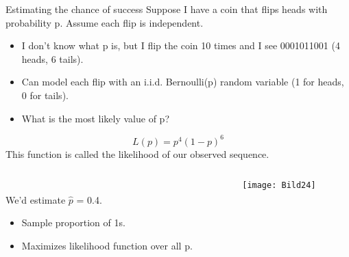 \documentclass[aspectratio=169]{../latex_main/tntbeamer}  %
\begin{document}
	
	\begin{frame}{Estimating the chance of success}
	    Suppose I have a coin that flips heads with probability p. Assume each flip is independent.
	    \begin{itemize}
	        \item I don’t know what p is, but I flip the coin 10 times and I see 0001011001 (4 heads, 6 tails).
	        \item Can model each flip with an i.i.d. Bernoulli(p) random variable (1 for heads, 0 for tails).
	        \item What is the most likely value of p?
	    \end{itemize}
	    \begin{equation*}
	        L(p) = p^4(1-p)^6
	    \end{equation*}
	    This function is called the likelihood of our observed sequence.
	    \begin{columns}
	        \begin{column}{.5\textwidth}
	        \\
	        \bigskip
	                We’d estimate  $\hat{p}$   = 0.4.
                \begin{itemize}
                    \item Sample proportion of 1s.
                    \item Maximizes likelihood function over all p. 
                \end{itemize}
	        \end{column}
	        
	        
	        \begin{column}{.4\textwidth}
	               \begin{figure}
	                     \centering
	                     \texttt{[image: Bild24]}
	              \end{figure}
	        \end{column}
	        
	        
	    \end{columns}
	    
	\end{frame}
	
	
	
\end{document}
